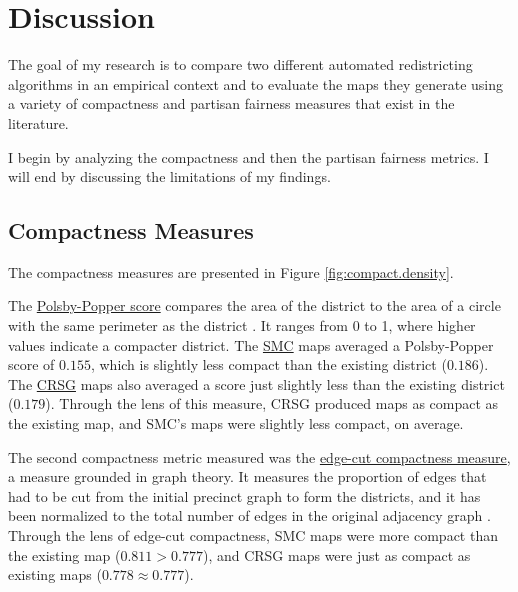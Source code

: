 \section{Discussion}
\label{sec:disc}

The goal of my research is to compare two different automated redistricting algorithms in an empirical context and to evaluate the maps they generate using a variety of compactness and partisan fairness measures that exist in the literature. 

I begin by analyzing the compactness and then the partisan fairness metrics. I will end by discussing the limitations of my findings. 

\subsection{Compactness Measures}

The compactness measures are presented in Figure \ref{fig:compact.density}. 

The \hyperref[sec:polsbypopper]{Polsby-Popper score} compares the area of the district to the area of a circle with the same perimeter as the district \parencite{polsby1991}. It ranges from 0 to 1, where higher values indicate a compacter district. The \hyperref[sec:smc]{SMC} maps averaged a Polsby-Popper score of $0.155$, which is slightly less compact than the existing district ($0.186$). The \hyperref[sec:crsg]{CRSG} maps also averaged a score just slightly less than the existing district ($0.179$). Through the lens of this measure, CRSG produced maps as compact as the existing map, and SMC's maps were slightly less compact, on average. 

The second compactness metric measured was the \hyperref[sec:edgecut]{edge-cut compactness measure}, a measure grounded in graph theory. It measures the proportion of edges that had to be cut from the initial precinct graph to form the districts, and it has been normalized to the total number of edges in the original adjacency graph \parencite{dube2016}. Through the lens of edge-cut compactness, SMC maps were more compact than the existing map ($0.811 > 0.777$), and CRSG maps were just as compact as existing maps ($0.778 \approx 0.777$). 

